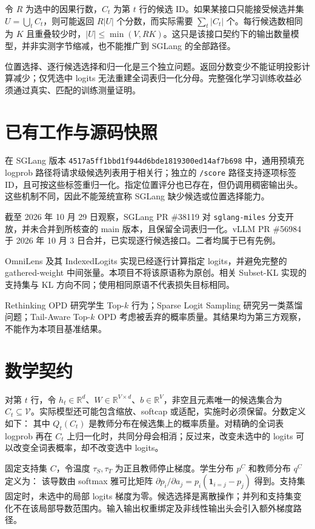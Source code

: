 \documentclass[11pt,a4paper]{article}
\newcommand{\code}[1]{{\small\nolinkurl{#1}}}
\begin{document}
令 $R$ 为选中的因果行数，$C_t$ 为第 $t$ 行的候选 ID。如果某接口只能接受候选并集 $U=\bigcup_t C_t$，则可能返回 $R|U|$ 个分数，而实际需要 $\sum_t|C_t|$ 个。每行候选数相同为 $K$ 且重叠较少时，$|U|\leq\min(V,RK)$。这只是该接口契约下的输出数量模型，并非实测字节缩减，也不能推广到 SGLang 的全部路径。

位置选择、逐行候选选择和归一化是三个独立问题。返回分数变少不能证明投影计算减少；仅凭选中 logits 无法重建全词表归一化分母。完整强化学习训练收益必须通过真实、匹配的训练测量证明。
\section{已有工作与源码快照}
在 SGLang 版本 \code{4517a5ff1bbd1f944d6bde1819300ed14af7b698} 中，通用预填充 logprob 路径将请求级候选列表用于相关行；独立的 \code{/score} 路径支持逐项标签 ID，且可按这些标签重归一化。指定位置评分也已存在，但仍调用稠密输出头。这些机制不同，因此不能笼统宣称 SGLang 缺少候选或位置选择能力。\cite{sglangio,sglanglogprob,sglangscore,sglanglogits}

截至 2026 年 10 月 29 日观察，SGLang PR \#38119 对 \code{sglang-miles} 分支开放，并未合并到所核查的 main 版本，且保留全词表归一化。vLLM PR \#56984 于 2026 年 10 月 3 日合并，已实现逐行候选接口。二者均属于已有先例。\cite{sglang38119,vllm56984}

OmniLens 及其 IndexedLogits 实现已经逐行计算指定 logits，并避免完整的 gathered-weight 中间张量。本项目不将该原语称为原创。相关 Subset-KL 实现的支持集与 KL 方向不同；使用相同原语不代表损失目标相同。\cite{omnilens2026,indexedlogits,subsetkl}

Rethinking OPD 研究学生 Top-$k$ 行为；Sparse Logit Sampling 研究另一类蒸馏问题；Tail-Aware Top-$k$ OPD 考虑被丢弃的概率质量。其结果均为第三方观察，不能作为本项目基准结果。\cite{rethinking2026,anshumann-etal-2025-sparse,tailaware2026}
\section{数学契约}
对第 $t$ 行，令 $h_t\in\mathbb{R}^d$、$W\in\mathbb{R}^{V\times d}$、$b\in\mathbb{R}^V$，非空且元素唯一的候选集合为 $C_t\subseteq\mathcal V$。实际模型还可能包含缩放、softcap 或适配，实施时必须保留。分数定义如下：
\ScoreEquations
其中 $Q_t(C_t)$ 是教师分布在候选集上的概率质量。对精确的全词表 logprob 再在 $C_t$ 上归一化时，共同分母会相消；反过来，改变未选中的 logits 可以改变全词表概率，却不改变选中 logits。

固定支持集 $C$，令温度 $\tau_S,\tau_T$ 为正且教师停止梯度。学生分布 $p^C$ 和教师分布 $q^C$ 定义为：
\KLEquations
该导数由 softmax 雅可比矩阵 $\partial p_i/\partial a_j=p_i(\mathbf 1_{i=j}-p_j)$ 得到。支持集固定时，未选中的局部 logits 梯度为零。候选选择是离散操作；并列和支持集变化不在该局部导数范围内。输入输出权重绑定及非线性输出头会引入额外梯度路径。
\end{document}
